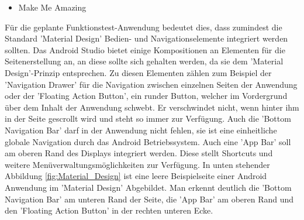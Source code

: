 \begin{itemize}
\begin{list}{}{}
\end{list}
\item Make Me Amazing
\end{itemize}

Für die geplante Funktionstest-Anwendung bedeutet dies, dass zumindest die Standard 'Material Design' Bedien- und Navigationselemente integriert werden sollten. Das Android Studio bietet einige Kompositionen an Elementen für die Seitenerstellung an, an diese sollte sich gehalten werden, da sie dem 'Material Design'-Prinzip entsprechen. Zu diesen Elementen zählen zum Beispiel der 'Navigation Drawer' für die Navigation zwischen einzelnen Seiten der Anwendung oder der 'Floating Action Button', ein runder Button, welcher im Vordergrund über dem Inhalt der Anwendung schwebt. Er verschwindet nicht, wenn hinter ihm in der Seite gescrollt wird und steht so immer zur Verfügung. Auch die 'Bottom Navigation Bar' darf in der Anwendung nicht fehlen, sie ist eine einheitliche globale Navigation durch das Android Betriebssystem. Auch eine 'App Bar' soll am oberen Rand des Displays integriert werden. Diese stellt Shortcuts und weitere Menüverwaltungsmöglichkeiten zur Verfügung. In unten stehender Abbildung \ref{fig:Material_Design} ist eine leere Beispielseite einer Android Anwendung im 'Material Design' Abgebildet. Man erkennt deutlich die 'Bottom Navigation Bar' am unteren Rand der Seite, die 'App Bar' am oberen Rand und den 'Floating Action Button' in der rechten unteren Ecke. 

